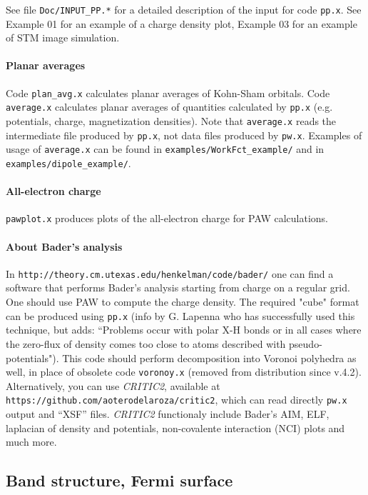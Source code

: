 \documentclass[12pt,a4paper]{article}
\def\pwx{\texttt{pw.x}}
\begin{document}
See file \texttt{Doc/INPUT\_PP.*} for a detailed description of the input
for code \texttt{pp.x}.
See Example 01 for an example of a charge density plot, Example 03
for an example of STM image simulation.

\paragraph{Planar averages}
Code \texttt{plan\_avg.x} calculates planar averages of Kohn-Sham orbitals.
Code \texttt{average.x} calculates planar averages of quantities calculated
by \texttt{pp.x} (e.g. potentials, charge, magnetization densities).
Note that \texttt{average.x} reads the intermediate file produced
by \texttt{pp.x}, not data files produced by \pwx. Examples of usage 
of \texttt{average.x} can be found in \texttt{examples/WorkFct\_example/} 
and in \texttt{examples/dipole\_example/}.

\paragraph{All-electron charge}
\texttt{pawplot.x} produces plots of the all-electron charge
for PAW calculations.

\paragraph{About Bader's analysis}
In \texttt{http://theory.cm.utexas.edu/henkelman/code/bader/} 
one can find a software that performs Bader's analysis starting 
from charge on a regular grid. One should use PAW to compute the
charge density. The required "cube" format can be produced using 
\texttt{pp.x} (info by G. Lapenna who has successfully used this 
technique, but adds: ``Problems occur with polar X-H bonds or in
all cases where the zero-flux of density comes too close to atoms 
described with pseudo-potentials"). This code should perform 
decomposition into Voronoi polyhedra as well, in place of obsolete
code  \texttt{voronoy.x} (removed from distribution since v.4.2).
Alternatively, you can use \textsl{CRITIC2}, available at
\texttt{https://github.com/aoterodelaroza/critic2}, which can
read directly \texttt{pw.x} output and ``XSF'' files. \textsl{CRITIC2}
functionaly include Bader's AIM, ELF, laplacian of density and
potentials, non-covalente interaction (NCI) plots and much more.

\subsection{Band structure, Fermi surface}
\end{document}
